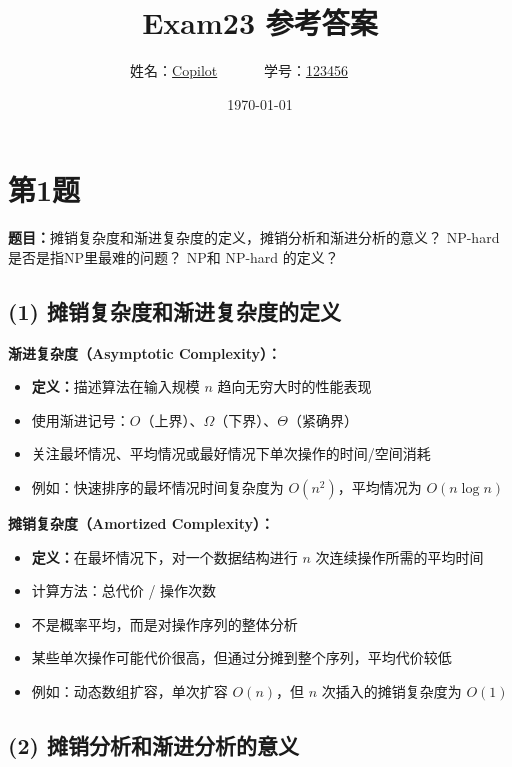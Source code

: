 \documentclass[UTF8,12pt,a4paper]{ctexart}
\title{Exam23 参考答案}
\author{
	姓名：\underline{Copilot}~~~~~~
	学号：\underline{123456}~~~~~~}
\date{\today}
\begin{document}
\fancyfoot[C]{\thepage}

\maketitle




\section*{第1题}
\textbf{题目：}摊销复杂度和渐进复杂度的定义，摊销分析和渐进分析的意义？ NP-hard 是否是指NP里最难的问题？ NP和 NP-hard 的定义？

\subsection*{(1) 摊销复杂度和渐进复杂度的定义}

\textbf{渐进复杂度（Asymptotic Complexity）：}
\begin{itemize}
	\item \textbf{定义：}描述算法在输入规模 $n$ 趋向无穷大时的性能表现
	\item 使用渐进记号：$O$（上界）、$\Omega$（下界）、$\Theta$（紧确界）
	\item 关注最坏情况、平均情况或最好情况下单次操作的时间/空间消耗
	\item 例如：快速排序的最坏情况时间复杂度为 $O(n^2)$，平均情况为 $O(n \log n)$
\end{itemize}

\textbf{摊销复杂度（Amortized Complexity）：}
\begin{itemize}
	\item \textbf{定义：}在最坏情况下，对一个数据结构进行 $n$ 次连续操作所需的平均时间
	\item 计算方法：总代价 / 操作次数
	\item 不是概率平均，而是对操作序列的整体分析
	\item 某些单次操作可能代价很高，但通过分摊到整个序列，平均代价较低
	\item 例如：动态数组扩容，单次扩容 $O(n)$，但 $n$ 次插入的摊销复杂度为 $O(1)$
\end{itemize}

\subsection*{(2) 摊销分析和渐进分析的意义}
\end{document}
